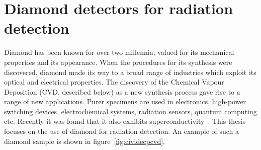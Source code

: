 
\chapter{Diamond detectors for radiation detection}
\label{ch:diamond}

%
%

Diamond has been known for over two millennia, valued for its mechanical properties and its appearance. When the procedures for its synthesis were discovered, diamond made its way to a broad range of industries which exploit its optical and electrical properties. The discovery of the Chemical Vapour Deposition (CVD, described below) as a new synthesis process gave rise to a range of new applications. Purer specimens are used in electronics, high-power switching devices, electrochemical systems, radiation sensors, quantum computing etc. Recently it was found that it also exhibits superconductivity~\cite{}. This thesis focuses on the use of diamond for radiation detection. An example of such a diamond sample is shown in figure~\ref{fig:cividecpcvd}.

